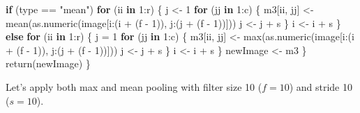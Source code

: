 \documentclass[
  12pt,
]{krantz}
\makeatletter
\newenvironment{Shaded}{\begin{snugshade}}{\end{snugshade}}
\newcommand{\ControlFlowTok}[1]{\textcolor[rgb]{0.27,0.27,0.27}{\textbf{#1}}}
\newcommand{\DecValTok}[1]{\textcolor[rgb]{0.06,0.06,0.06}{#1}}
\newcommand{\FunctionTok}[1]{\textcolor[rgb]{0,0,0}{#1}}
\newcommand{\NormalTok}[1]{#1}
\newcommand{\OtherTok}[1]{\textcolor[rgb]{0.37,0.37,0.37}{#1}}
\newcommand{\SpecialCharTok}[1]{\textcolor[rgb]{0,0,0}{#1}}
\newcommand{\StringTok}[1]{\textcolor[rgb]{0.5,0.5,0.5}{#1}}
\newenvironment{kframe}{%
\medskip{}
\setlength{\fboxsep}{.8em}
 \def\at@end@of@kframe{}%
 \ifinner\ifhmode%
  \def\at@end@of@kframe{\end{minipage}}%
  \begin{minipage}{\columnwidth}%
 \fi\fi%
 \def\FrameCommand##1{\hskip\@totalleftmargin \hskip-\fboxsep
 \colorbox{shadecolor}{##1}\hskip-\fboxsep
     \hskip-\linewidth \hskip-\@totalleftmargin \hskip\columnwidth}%
 \MakeFramed {\advance\hsize-\width
   \@totalleftmargin\z@ \linewidth\hsize
   \@setminipage}}%
 {\par\unskip\endMakeFramed%
 \at@end@of@kframe}
\renewenvironment{Shaded}{\begin{kframe}}{\end{kframe}}
\makeatother
\begin{document}
\begin{Shaded}
\begin{Highlighting}[]
        \ControlFlowTok{if}\NormalTok{ (type }\SpecialCharTok{==} \StringTok{"mean"}\NormalTok{)}
            \ControlFlowTok{for}\NormalTok{ (ii }\ControlFlowTok{in} \DecValTok{1}\SpecialCharTok{:}\NormalTok{r) \{}
\NormalTok{                j }\OtherTok{\textless{}{-}} \DecValTok{1}
                \ControlFlowTok{for}\NormalTok{ (jj }\ControlFlowTok{in} \DecValTok{1}\SpecialCharTok{:}\NormalTok{c) \{}
\NormalTok{                  m3[ii, jj] }\OtherTok{\textless{}{-}} \FunctionTok{mean}\NormalTok{(}\FunctionTok{as.numeric}\NormalTok{(image[i}\SpecialCharTok{:}\NormalTok{(i }\SpecialCharTok{+}
\NormalTok{                    (f }\SpecialCharTok{{-}} \DecValTok{1}\NormalTok{)), j}\SpecialCharTok{:}\NormalTok{(j }\SpecialCharTok{+}\NormalTok{ (f }\SpecialCharTok{{-}} \DecValTok{1}\NormalTok{))]))}
\NormalTok{                  j }\OtherTok{\textless{}{-}}\NormalTok{ j }\SpecialCharTok{+}\NormalTok{ s}
\NormalTok{                \}}
\NormalTok{                i }\OtherTok{\textless{}{-}}\NormalTok{ i }\SpecialCharTok{+}\NormalTok{ s}
\NormalTok{            \} }\ControlFlowTok{else} \ControlFlowTok{for}\NormalTok{ (ii }\ControlFlowTok{in} \DecValTok{1}\SpecialCharTok{:}\NormalTok{r) \{}
\NormalTok{            j }\OtherTok{=} \DecValTok{1}
            \ControlFlowTok{for}\NormalTok{ (jj }\ControlFlowTok{in} \DecValTok{1}\SpecialCharTok{:}\NormalTok{c) \{}
\NormalTok{                m3[ii, jj] }\OtherTok{\textless{}{-}} \FunctionTok{max}\NormalTok{(}\FunctionTok{as.numeric}\NormalTok{(image[i}\SpecialCharTok{:}\NormalTok{(i }\SpecialCharTok{+}
\NormalTok{                  (f }\SpecialCharTok{{-}} \DecValTok{1}\NormalTok{)), j}\SpecialCharTok{:}\NormalTok{(j }\SpecialCharTok{+}\NormalTok{ (f }\SpecialCharTok{{-}} \DecValTok{1}\NormalTok{))]))}
\NormalTok{                j }\OtherTok{\textless{}{-}}\NormalTok{ j }\SpecialCharTok{+}\NormalTok{ s}
\NormalTok{            \}}
\NormalTok{            i }\OtherTok{\textless{}{-}}\NormalTok{ i }\SpecialCharTok{+}\NormalTok{ s}
\NormalTok{        \}}
\NormalTok{        newImage }\OtherTok{\textless{}{-}}\NormalTok{ m3}
\NormalTok{    \}}
    \FunctionTok{return}\NormalTok{(newImage)}
\NormalTok{\}}
\end{Highlighting}
\end{Shaded}

Let's apply both max and mean pooling with filter size 10 (\(f = 10\)) and stride 10 (\(s = 10\)).
\end{document}
